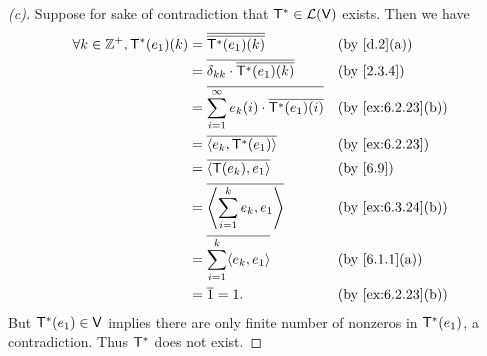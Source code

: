 \begin{proof}[(c)]
  Suppose for sake of contradiction that \(\mathsf{T}^* \in \mathcal{L}(\mathsf{V})\) exists.
  Then we have
  \begin{align*}
    \forall k \in \Z^+, \T^*(e_1)(k) & = \conj{\conj{\T^*(e_1)(k)}}                                  &  & \by{d.2}[a]       \\
                                     & = \conj{\delta_{k k} \cdot \conj{\T^*(e_1)(k)}}               &  & \by{2.3.4}        \\
                                     & = \conj{\sum_{i = 1}^\infty e_k(i) \cdot \conj{\T^*(e_1)(i)}} &  & \by{ex:6.2.23}[b] \\
                                     & = \conj{\inn{e_k, \T^*(e_1)}}                                 &  & \by{ex:6.2.23}    \\
                                     & = \conj{\inn{\T(e_k), e_1}}                                   &  & \by{6.9}          \\
                                     & = \conj{\inn{\sum_{i = 1}^k e_k, e_1}}                        &  & \by{ex:6.3.24}[b] \\
                                     & = \conj{\sum_{i = 1}^k \inn{e_k, e_1}}                        &  & \by{6.1.1}[a]     \\
                                     & = \conj{1} = 1.                                               &  & \by{ex:6.2.23}[b]
  \end{align*}
  But \(\mathsf{T}^*(e_1) \in \mathsf{V}\) implies there are only finite number of nonzeros in \(\mathsf{T}^*(e_1)\), a contradiction.
  Thus \(\mathsf{T}^*\) does not exist.
\end{proof}
